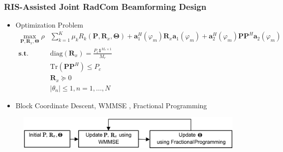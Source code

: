 \documentclass[9pt]{beamer}
\begin{document}

\begin{frame}
  \frametitle{RIS-Assisted Joint RadCom Beamforming Design}

  \begin{itemize}
    \item Optimization Problem
      \begin{align*}
        \max_{\mathbf{P},\mathbf{R}_x,\mathbf{\Theta}} \rho&\sum_{k=1}^K \mu_k R_k(\mathbf{P},\mathbf{R}_x,\mathbf{\Theta}) + \mathbf{a}_1^H(\varphi_m)\mathbf{R}_x \mathbf{a}_1(\varphi_m) + \mathbf{a}_2^H(\varphi_m)\mathbf{P}\mathbf{P}^H\mathbf{a}_2(\varphi_m) \\ 
        \mathbf{s.t.} \quad  &\mathrm{diag}(\mathbf{R}_x) = \frac{P_r \mathbf{1}^{M_r \times 1}}{M_r} 
        \\ &\mathrm{Tr} (\mathbf{P}\mathbf{P}^H) \leq P_c 
        \\ &\mathbf{R}_x \succeq 0 
        \\ &|\theta_n| \leq 1,n=1,...,N 
      \end{align*}
    \item Block Coordinate Descent, WMMSE  , Fractional Programming 
  \end{itemize}
  \begin{figure}
    \includegraphics[width=0.9\linewidth]{Fig5.png}
  \end{figure}
\end{frame}

\end{document}
